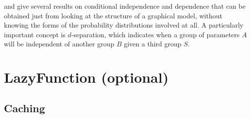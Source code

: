 \cite{dawidmarkov} and \cite{jordangraphical} give several results on conditional independence and dependence that can be obtained just from looking at the structure of a graphical model, without knowing the forms of the probability distributions involved at all. A particularly important concept is $d$-separation, which indicates when a group of parameters $A$ will be independent of another group $B$ given a third group $S$.

\section{LazyFunction (optional)}
\subsection{Caching}  
\label{sec:caching}

